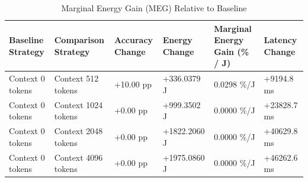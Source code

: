 \begin{table}
\caption{Marginal Energy Gain (MEG) Relative to Baseline}
\label{tab:marginal_energy_gain}
\begin{tabular}{llllll}
\toprule
Baseline Strategy & Comparison Strategy & Accuracy Change & Energy Change & Marginal Energy Gain (\% / J) & Latency Change \\
\midrule
Context 0 tokens & Context 512 tokens & +10.00 pp & +336.0379 J & 0.0298 \%/J & +9194.8 ms \\
Context 0 tokens & Context 1024 tokens & +0.00 pp & +999.3502 J & 0.0000 \%/J & +23828.7 ms \\
Context 0 tokens & Context 2048 tokens & +0.00 pp & +1822.2060 J & 0.0000 \%/J & +40629.8 ms \\
Context 0 tokens & Context 4096 tokens & +0.00 pp & +1975.0860 J & 0.0000 \%/J & +46262.6 ms \\
\bottomrule
\end{tabular}
\end{table}
